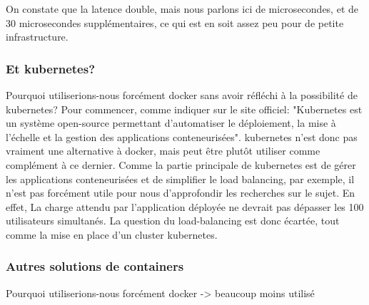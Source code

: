 \documentclass[
    iai, %
    il, %
]{heig-tb}
\begin{document}
On constate que la latence double, mais nous parlons ici de microsecondes, et de 30 microsecondes supplémentaires, ce qui est en soit assez peu pour de petite infrastructure.




\subsubsection{Et \Gls{kubernetes}?}
Pourquoi utiliserions-nous forcément \Gls{docker} sans avoir réfléchi à la possibilité de \Gls{kubernetes}?
Pour commencer, comme indiquer sur le site officiel:
"Kubernetes est un système open-source permettant d'automatiser le déploiement, la mise à l'échelle et la gestion des applications conteneurisées".
\Gls{kubernetes} n'est donc pas vraiment une alternative à \Gls{docker}, mais peut être plutôt utiliser comme complément à ce dernier.
Comme la partie principale de \Gls{kubernetes} est de gérer les applications conteneurisées et de simplifier le load balancing, par exemple, il n'est pas forcément utile pour nous d'approfondir les recherches sur le sujet.
En effet, La charge attendu par l'application déployée ne devrait pas dépasser les 100 utilisateurs simultanés. La question du load-balancing est donc écartée, tout comme la mise en place d'un cluster \Gls{kubernetes}.




\subsubsection{Autres solutions de containers}
Pourquoi utiliserions-nous forcément \Gls{docker}
-> beaucoup moins utilisé
\end{document}
